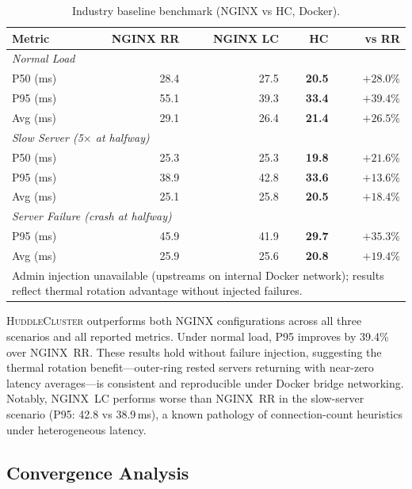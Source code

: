 \documentclass[10pt,twocolumn]{article}
\begin{document}
\begin{table}[h]
\centering
\caption{Industry baseline benchmark (NGINX vs HC, Docker).}
\label{tab:industry}
\small
\setlength{\tabcolsep}{4pt}
\begin{tabular}{lrrrr}
\toprule
Metric & NGINX RR & NGINX LC & HC & vs RR \\
\midrule
\multicolumn{5}{l}{\textit{Normal Load}} \\
P50 (ms)   & 28.4 & 27.5 & \textbf{20.5} & $+28.0\%$ \\
P95 (ms)   & 55.1 & 39.3 & \textbf{33.4} & $+39.4\%$ \\
Avg (ms)   & 29.1 & 26.4 & \textbf{21.4} & $+26.5\%$ \\
\midrule
\multicolumn{5}{l}{\textit{Slow Server (5$\times$ at halfway)}} \\
P50 (ms)   & 25.3 & 25.3 & \textbf{19.8} & $+21.6\%$ \\
P95 (ms)   & 38.9 & 42.8 & \textbf{33.6} & $+13.6\%$ \\
Avg (ms)   & 25.1 & 25.8 & \textbf{20.5} & $+18.4\%$ \\
\midrule
\multicolumn{5}{l}{\textit{Server Failure (crash at halfway)}} \\
P95 (ms)   & 45.9 & 41.9 & \textbf{29.7} & $+35.3\%$ \\
Avg (ms)   & 25.9 & 25.6 & \textbf{20.8} & $+19.4\%$ \\
\bottomrule
\multicolumn{5}{p{7.5cm}}{\footnotesize Admin injection unavailable
(upstreams on internal Docker network); results reflect thermal rotation
advantage without injected failures.}
\end{tabular}
\end{table}

\textsc{HuddleCluster} outperforms both NGINX configurations across all
three scenarios and all reported metrics.
Under normal load, P95 improves by 39.4\% over NGINX~RR\@.
These results hold without failure injection, suggesting the thermal
rotation benefit---outer-ring rested servers returning with near-zero
latency averages---is consistent and reproducible under Docker bridge
networking.
Notably, NGINX~LC performs worse than NGINX~RR in the slow-server
scenario (P95: 42.8 vs 38.9\,ms), a known pathology of connection-count
heuristics under heterogeneous latency.

\subsection{Convergence Analysis}
\end{document}

